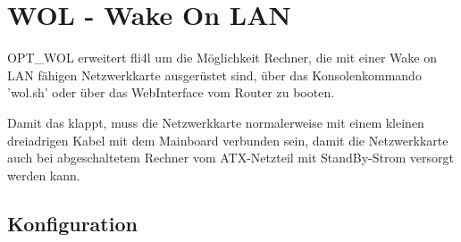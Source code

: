 {
\section {WOL - Wake On LAN}
}
OPT\_WOL erweitert fli4l um die Möglichkeit Rechner, die mit einer Wake on LAN
fähigen Netzwerkkarte ausgerüstet sind, über das Konsolenkommando 'wol.sh' oder
über das WebInterface vom Router zu booten.

Damit das klappt, muss die Netzwerkkarte normalerweise mit einem kleinen
dreiadrigen Kabel mit dem Mainboard verbunden sein, damit die Netzwerkkarte
auch bei abgeschaltetem Rechner vom ATX-Netzteil mit StandBy-Strom versorgt
werden kann.

\subsection {Konfiguration}

